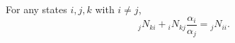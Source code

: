 For any states $i, j, k$ with $i \neq j$,
$${}_j N_{ki} + {}_i N_{kj} \frac{\alpha_i}{\alpha_j} = {}_j N_{ii}.$$
